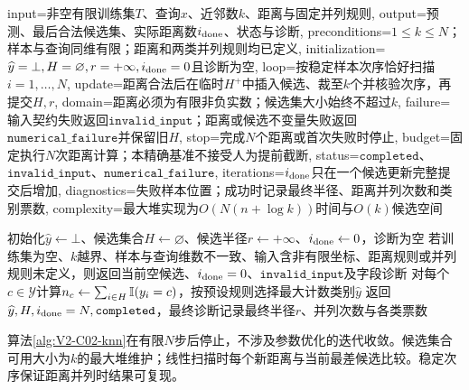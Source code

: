 \begin{AlgorithmContract}{
  input={非空有限训练集$T$、查询$x$、近邻数$k$、距离与固定并列规则},
  output={预测、最后合法候选集、实际距离数$i_{\rm done}$、状态与诊断},
  preconditions={$1\le k\le N$；样本与查询同维有限；距离和两类并列规则均已定义},
  initialization={$\widehat y=\bot,H=\varnothing,r=+\infty,i_{\rm done}=0$且诊断为空},
  loop={按稳定样本次序恰好扫描$i=1,\ldots,N$},
  update={距离合法后在临时$H^+$中插入候选、裁至$k$个并核验次序，再提交$H,r$},
  domain={距离必须为有限非负实数；候选集大小始终不超过$k$},
  failure={输入契约失败返回$\mathtt{invalid\_input}$；距离或候选不变量失败返回$\mathtt{numerical\_failure}$并保留旧$H$},
  stop={完成$N$个距离或首次失败时停止},
  budget={固定执行$N$次距离计算；本精确基准不接受人为提前截断},
  status={$\mathtt{completed}$、$\mathtt{invalid\_input}$、$\mathtt{numerical\_failure}$},
  iterations={$i_{\rm done}$只在一个候选更新完整提交后增加},
  diagnostics={失败样本位置；成功时记录最终半径、距离并列次数和类别票数},
  complexity={最大堆实现为$O(N(n+\log k))$时间与$O(k)$候选空间}
}
\begin{algorithm}[H]
\caption{线性扫描的\kNN{}分类}\label{alg:V2-C02-knn}
初始化$\widehat y\leftarrow\bot$、候选集合$H\leftarrow\varnothing$、候选半径$r\leftarrow+\infty$、$i_{\rm done}\leftarrow0$，诊断为空\;
若训练集为空、$k$越界、样本与查询维数不一致、输入含非有限坐标、距离规则或并列规则未定义，则返回当前空候选、$i_{\rm done}=0$、$\mathtt{invalid\_input}$及字段诊断\;
对每个$c\in\mathcal Y$计算$n_c\leftarrow\sum_{i\in H}\mathbb{I}(y_i=c)$，按预设规则选择最大计数类别$\widehat y$\;
返回$\widehat y,H,i_{\rm done}=N,\mathtt{completed}$，最终诊断记录最终半径$r$、并列次数与各类票数\;
\end{algorithm}
\end{AlgorithmContract}

算法\ref{alg:V2-C02-knn}在有限$N$步后停止，不涉及参数优化的迭代收敛。候选集合可用大小为$k$的最大堆维护；线性扫描时每个新距离与当前最差候选比较。稳定次序保证距离并列时结果可复现。


